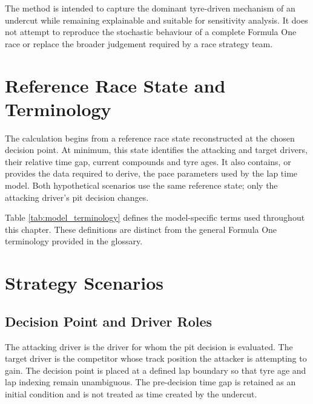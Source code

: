 The method is intended to capture the dominant tyre-driven mechanism of an
undercut while remaining explainable and suitable for sensitivity analysis. It
does not attempt to reproduce the stochastic behaviour of a complete Formula
One race or replace the broader judgement required by a race strategy team.

\section{Reference Race State and Terminology}
\label{sec:reference-race-state}

The calculation begins from a reference race state reconstructed at the chosen
decision point. At minimum, this state identifies the attacking and target
drivers, their relative time gap, current compounds and tyre ages. It also
contains, or provides the data required to derive, the pace parameters used by
the lap time model. Both hypothetical scenarios use the same reference state;
only the attacking driver's pit decision changes.

Table \ref{tab:model_terminology} defines the model-specific terms used
throughout this chapter. These definitions are distinct from the general
Formula One terminology provided in the glossary.



\section{Strategy Scenarios}
\label{sec:scenario-definition}


\subsection{Decision Point and Driver Roles}
\label{subsec:driver-roles}

The attacking driver is the driver for whom the pit decision is evaluated. The
target driver is the competitor whose track position the attacker is attempting
to gain. The decision point is placed at a defined lap boundary so that tyre
age and lap indexing remain unambiguous. The pre-decision time gap is retained
as an initial condition and is not treated as time created by the undercut.

